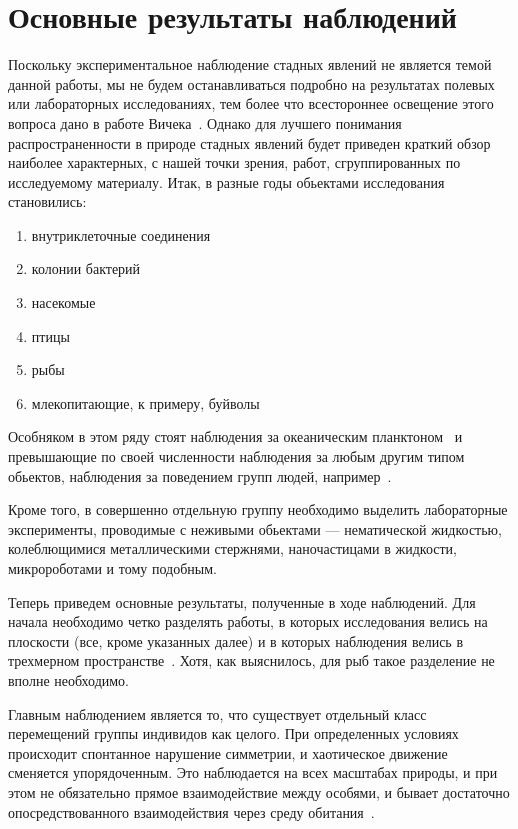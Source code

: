 \section{Основные результаты наблюдений} %
\label{sec:ObservationResults}
	Поскольку экспериментальное наблюдение стадных явлений не является темой данной работы, мы не будем останавливаться подробно на результатах полевых или лабораторных исследованиях, тем более что всестороннее освещение этого вопроса дано в работе Вичека~\cite{vicsek2012}. Однако для лучшего понимания распространенности в природе стадных явлений будет приведен краткий обзор наиболее характерных, с нашей точки зрения, работ, сгруппированных по исследуемому материалу. Итак, в разные годы обьектами исследования становились:
	\begin{enumerate}
		\item внутриклеточные соединения~\cite{chowdhury2006,keller1971}
		\item колонии бактерий~\cite{czirok1998,csahok1997}
		\item насекомые~\cite{buhl2006}
		\item птицы~\cite{ballerini2008,selous1931,dellariccia2008,biro2006,major1978,nagy2010}
		\item рыбы~\cite{cambui2012,makris2009,parrish1997}
		\item млекопитающие, к примеру, буйволы~\cite{sinclair1977}
	\end{enumerate}
	Особняком в этом ряду стоят наблюдения за океаническим планктоном~\cite{seuront2004} и превышающие по своей численности наблюдения за любым другим типом обьектов, наблюдения за поведением групп людей, например~\cite{parisi2009,moussaid2011}.

	Кроме того, в совершенно отдельную группу необходимо выделить лабораторные эксперименты, проводимые с неживыми обьектами --- нематической жидкостью, колеблющимися металлическими стержнями, наночастицами в жидкости, микророботами и тому подобным.~\cite{schaller2010,turgut2008,blair2003}

	Теперь приведем основные результаты, полученные в ходе наблюдений. Для начала необходимо четко разделять работы, в которых исследования велись на плоскости (все, кроме указанных далее) и в которых наблюдения велись в трехмерном пространстве~\cite{cullen1965,ballerini2008,major1978,makris2009}. Хотя, как выяснилось, для рыб такое разделение не вполне необходимо.

	Главным наблюдением является то, что существует отдельный класс перемещений группы индивидов как целого. При определенных условиях происходит спонтанное нарушение симметрии, и хаотическое движение сменяется упорядоченным. Это наблюдается на всех масштабах природы, и при этом не обязательно прямое взаимодействие между особями, и бывает достаточно опосредствованного взаимодействия через среду обитания~\cite[с. 119]{vicsek2012}. 

